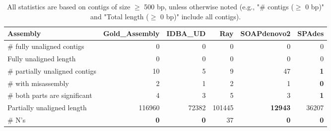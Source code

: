 \documentclass[12pt,a4paper]{article}
\begin{document}
\begin{table}[ht]
\begin{center}
\caption{All statistics are based on contigs of size $\geq$ 500 bp, unless otherwise noted (e.g., "\# contigs ($\geq$ 0 bp)" and "Total length ($\geq$ 0 bp)" include all contigs).}
\begin{tabular}{|l*{5}{|r}|}
\hline
Assembly & Gold\_Assembly & IDBA\_UD & Ray & SOAPdenovo2 & SPAdes \\ \hline
\# fully unaligned contigs & 0 & 0 & 0 & 0 & 0 \\ \hline
Fully unaligned length & 0 & 0 & 0 & 0 & 0 \\ \hline
\# partially unaligned contigs & 10 & 5 & 9 & 47 & {\bf 1} \\ \hline
\hspace{5mm}\# with misassembly & 2 & 1 & 2 & 1 & {\bf 0} \\ \hline
\hspace{5mm}\# both parts are significant & 4 & 3 & 5 & 3 & {\bf 1} \\ \hline
Partially unaligned length & 116960 & 72382 & 101445 & {\bf 12943} & 36207 \\ \hline
\# N's & {\bf 0} & {\bf 0} & 37 & {\bf 0} & {\bf 0} \\ \hline
\end{tabular}
\end{center}
\end{table}
\end{document}
